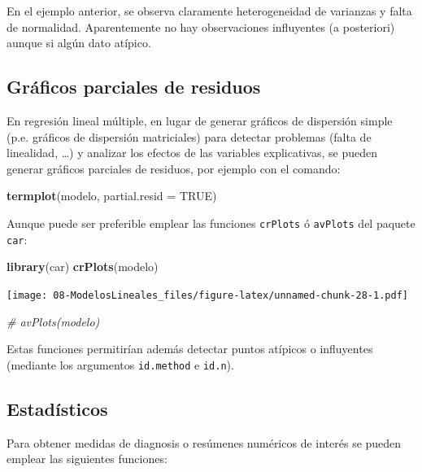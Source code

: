 \documentclass[]{book}
\newenvironment{Shaded}{\begin{snugshade}}{\end{snugshade}}
\newcommand{\KeywordTok}[1]{\textcolor[rgb]{0.13,0.29,0.53}{\textbf{#1}}}
\newcommand{\DataTypeTok}[1]{\textcolor[rgb]{0.13,0.29,0.53}{#1}}
\newcommand{\CommentTok}[1]{\textcolor[rgb]{0.56,0.35,0.01}{\textit{#1}}}
\newcommand{\OtherTok}[1]{\textcolor[rgb]{0.56,0.35,0.01}{#1}}
\newcommand{\NormalTok}[1]{#1}
\begin{document}
En el ejemplo anterior, se observa claramente heterogeneidad de
varianzas y falta de normalidad. Aparentemente no hay observaciones
influyentes (a posteriori) aunque si algún dato atípico.

\subsection{Gráficos parciales de
residuos}\label{graficos-parciales-de-residuos}

En regresión lineal múltiple, en lugar de generar gráficos de dispersión
simple (p.e. gráficos de dispersión matriciales) para detectar problemas
(falta de linealidad, \ldots{}) y analizar los efectos de las variables
explicativas, se pueden generar gráficos parciales de residuos, por
ejemplo con el comando:

\begin{Shaded}
\begin{Highlighting}[]
\KeywordTok{termplot}\NormalTok{(modelo, }\DataTypeTok{partial.resid =} \OtherTok{TRUE}\NormalTok{)}
\end{Highlighting}
\end{Shaded}

Aunque puede ser preferible emplear las funciones \texttt{crPlots} ó
\texttt{avPlots} del paquete \texttt{car}:

\begin{Shaded}
\begin{Highlighting}[]
\KeywordTok{library}\NormalTok{(car)}
\KeywordTok{crPlots}\NormalTok{(modelo)}
\end{Highlighting}
\end{Shaded}

\texttt{[image: 08-ModelosLineales\_files/figure-latex/unnamed-chunk-28-1.pdf]}

\begin{Shaded}
\begin{Highlighting}[]
\CommentTok{# avPlots(modelo)}
\end{Highlighting}
\end{Shaded}

Estas funciones permitirían además detectar puntos atípicos o
influyentes (mediante los argumentos \texttt{id.method} e
\texttt{id.n}).

\subsection{Estadísticos}\label{estadisticos}

Para obtener medidas de diagnosis o resúmenes numéricos de interés se
pueden emplear las siguientes funciones:
\end{document}
